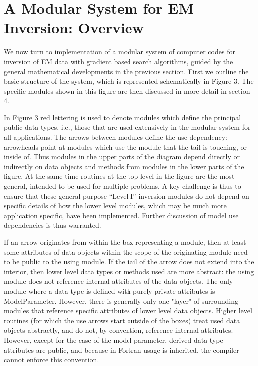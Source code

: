 \section{A Modular System for EM Inversion: Overview}

We now turn to implementation of a modular system of computer
codes for inversion of EM data with gradient based search algorithms,
guided by the general mathematical developments
in the previous section.  
First we outline the basic structure of the system, which is represented schematically
in Figure 3.  The specific modules shown in this figure
are then discussed in more detail in section 4.

In Figure 3 red lettering is used to denote modules which define
the principal public data types, i.e., those that are used 
extensively in the modular system for all applications.
The arrows between modules define the use dependency: arrowheads point
at modules which use the module that the tail is touching,
or inside of.  
Thus modules in the upper parts of the diagram
depend directly or indirectly on data
objects and methods from modules 
in the lower parts of the figure.
At the same time routines at the top level in the figure
are the most general, intended to be used for multiple problems.
A key challenge is thus to ensure that these general purpose
``Level I'' inversion modules do not depend on specific
details of how the lower level modules,
which may be much more application specific, have been implemented.
Further discussion of model use dependencies is thus warranted.

If an arrow originates from within the
box representing a module, then at least some 
attributes of data objects within
the scope of the originating module need to be public to
the using module.  If the tail of the arrow does not extend into
the interior, then lower level data types or methods used
are more abstract: the using module does not
reference internal attributes of the data objects.  
The only module where a data type is defined with
purely private attributes is ModelParameter.
However, there is generally only one "layer" of
surrounding modules that reference
specific attributes of lower level data objects.
Higher level routines (for which the use arrows start outside
of the boxes) treat used data objects abstractly, and
do not, by convention, reference internal attributes.
However, except for the case of the model parameter,
derived data type attributes are public,
and because in Fortran usage is inherited,
the compiler cannot enforce this convention.

